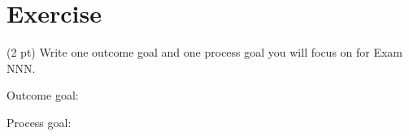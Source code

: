 %
%
%
%

\section{Exercise}

(2 pt) Write one outcome goal and one process goal you will focus on for Exam NNN.

\vspace{0.25in}

\noindent{}Outcome goal:

\vspace{1in}

\noindent{}Process goal:

\vspace{1in}